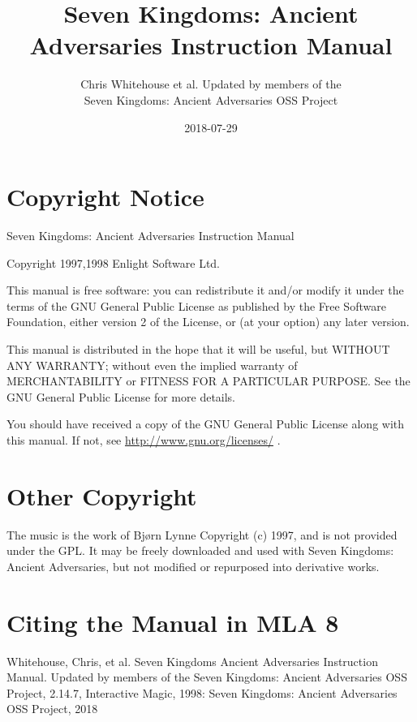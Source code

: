 \documentclass[openany,a4paper,12pt]{book}
\begin{document}
\begin{titlepage}
	\title{Seven Kingdoms: Ancient Adversaries Instruction Manual}
	\author{Chris Whitehouse et al. Updated by members of the \\
		Seven Kingdoms: Ancient Adversaries OSS Project}
	\date{2018-07-29}
\end{titlepage}
\frontmatter
\maketitle

\section{Copyright Notice}

Seven Kingdoms: Ancient Adversaries Instruction Manual

Copyright 1997,1998 Enlight Software Ltd.

This manual is free software: you can redistribute it and/or modify it under the terms of the GNU General Public License as published by the Free Software Foundation, either version 2 of the License, or (at your option) any later version.

This manual is distributed in the hope that it will be useful, but WITHOUT ANY WARRANTY; without even the implied warranty of MERCHANTABILITY or FITNESS FOR A PARTICULAR PURPOSE.  See the GNU General Public License for more details.

You should have received a copy of the GNU General Public License along with this manual.  If not, see \href{<http://www.gnu.org/licenses/>}{http://www.gnu.org/licenses/} .

\section{Other Copyright}

The music is the work of Bjørn Lynne Copyright (c) 1997, and is not provided under the GPL. It may be freely downloaded and used with Seven Kingdoms: Ancient Adversaries, but not modified or repurposed into derivative works. 

\section{Citing the Manual in MLA 8}

Whitehouse, Chris, et al. Seven Kingdoms Ancient Adversaries Instruction Manual. Updated by members of the Seven Kingdoms: Ancient Adversaries OSS Project, 2.14.7, Interactive Magic, 1998: Seven Kingdoms: Ancient Adversaries OSS Project, 2018
\end{document}
